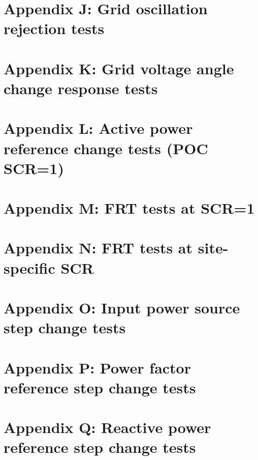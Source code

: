 \documentclass{../grid-link-report}
\begin{document}
	\section{Appendix J: Grid oscillation rejection tests}
	\label{Appendix J: Grid oscillation rejection tests}
	\section{Appendix K: Grid voltage angle change response tests}
	\label{Appendix K: Grid voltage angle change response tests}
	\section{Appendix L: Active power reference change tests (POC SCR=1)}
	\label{Appendix L: Active power reference change tests (POC SCR=1)}
	\section{Appendix M: FRT tests at SCR=1}
	\label{Appendix M: FRT tests at SCR=1}
	\section{Appendix N: FRT tests at site-specific SCR}
	\label{Appendix N: FRT tests at site-specific SCR}
	\section{Appendix O: Input power source step change tests}
	\label{Appendix O: Input power source step change tests}
	\section{Appendix P: Power factor reference step change tests}
	\label{Appendix P: Power factor reference step change tests}
	\section{Appendix Q: Reactive power reference step change tests}
	\label{Appendix Q: Reactive power reference step change tests}
	
	
	
	
	
	
	
\end{document}
